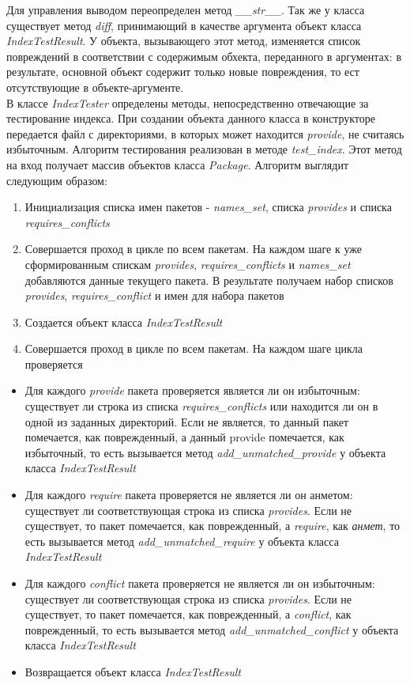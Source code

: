 Для управления выводом переопределен метод \textit{\_\_str\_\_}. Так же у класса существует метод \textit{diff},
принимающий в качестве аргумента объект класса \textit{IndexTestResult}. У объекта, 
вызывающего этот метод, изменяется список повреждений в соответствии с содержимым обхекта,
переданного в аргументах: в результате, основной объект содержит только новые повреждения,
то ест отсутствующие в объекте-аргументе.\\

В классе \textit{IndexTester} определены методы, непосредственно отвечающие за тестирование
индекса. При создании объекта данного класса в конструкторе передается файл с директориями,
в которых может находится \textit{provide}, не считаясь избыточным. 
Алгоритм тестирования реализован в методе \textit{test\_index}. Этот метод на вход
получает массив объектов класса \textit{Package}. Алгоритм выглядит следующим образом:
\begin{enumerate}
\item{Инициализация списка имен пакетов - \textit{names\_set}, списка \textit{provides} и 
списка \textit{requires\_conflicts}}
\item{Совершается проход в цикле по всем пакетам. На каждом шаге 
к уже сформированным спискам \textit{provides}, \textit{requires\_conflicts} и \textit{names\_set} 
добавляются данные текущего пакета. В результате получаем набор списков \textit{provides}, 
\textit{requires\_conflict} и имен для набора пакетов}
\item{Создается объект класса \textit{IndexTestResult}}
\item{Совершается проход в цикле по всем пакетам. На каждом шаге цикла проверяется}
\end{enumerate}
\begin{itemize}
	\item{Для каждого \textit{provide} пакета проверяется является ли он избыточным: существует ли
	строка из списка \textit{requires\_conflicts} или находится ли он в одной из заданных директорий.
	Если не является, то данный пакет помечается, как поврежденный, а данный provide помечается,
	как избыточный, то есть вызывается метод \emph{add\_unmatched\_provide} у объекта класса \textit{IndexTestResult}}
	\item{Для каждого \textit{require} пакета проверяется не является ли он анметом: существует ли
	соответствующая строка из списка \textit{provides}. Если не существует, то пакет помечается, как 
	поврежденный, а \textit{require}, как \textit{анмет}, то есть вызывается метод \textit{add\_unmatched\_require}
	у объекта класса \textit{IndexTestResult}}
	\item{Для каждого \textit{conflict} пакета проверяется не является ли он избыточным: существует ли
	соответствующая строка из списка \textit{provides}. Если не существует, то пакет помечается, как 
	поврежденный, а \textit{conflict}, как поврежденный, то есть вызывается метод \textit{add\_unmatched\_conflict}
	у объекта класса \textit{IndexTestResult}}
	\item{Возвращается объект класса \textit{IndexTestResult}}
\end{itemize}

